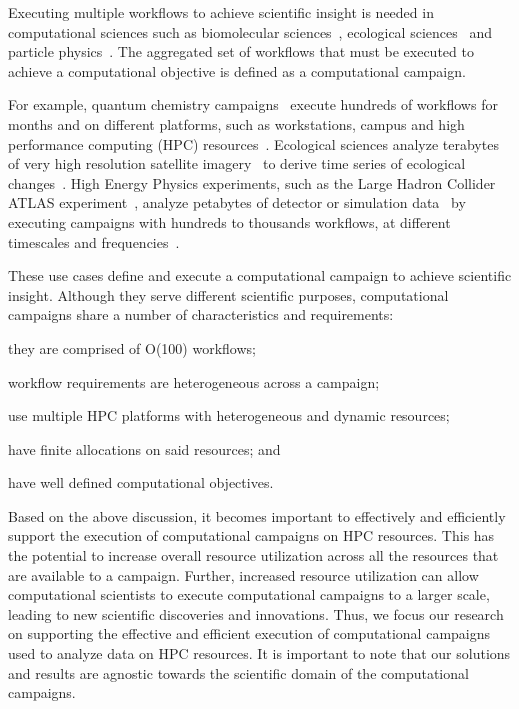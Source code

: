 
Executing multiple workflows to achieve scientific insight is needed in
computational sciences such as biomolecular sciences~\cite{cheatham2015impact,
dakka2018concurrent}, ecological sciences~\cite{goncalves2020sealnet,
paraskevakos2019workflow} and particle physics~\cite{atlas}. The aggregated
set of workflows that must be executed to achieve a computational objective is
defined as a computational campaign.

For example, quantum chemistry campaigns~\cite{smith2020molssi} execute hundreds
of workflows for months and on different platforms, such as workstations, campus
and high performance computing (HPC) resources~\cite{smith2020molssi}.
Ecological sciences analyze terabytes of very high resolution satellite
imagery~\cite{goncalves2020sealnet} to derive time series of ecological
changes~\cite{paraskevakos2019workflow}. High Energy Physics experiments, such
as the Large Hadron Collider ATLAS experiment~\cite{atlas}, analyze petabytes of
detector or simulation data~\cite{borodin2015big} by executing campaigns with
hundreds to thousands workflows, at different timescales and
frequencies~\cite{borodin2015big}.

These use cases define and execute a computational campaign to achieve
scientific insight. Although they serve different scientific purposes,
computational campaigns share a number of characteristics and requirements:
\begin{inparaenum}[(1)]
    \item they are comprised of O(100) workflows;
    \item workflow requirements are heterogeneous across a campaign;
    \item use multiple HPC platforms with heterogeneous and dynamic resources;
    \item have finite allocations on said resources; and
    \item have well defined computational objectives.
\end{inparaenum}

Based on the above discussion, it becomes important to effectively and
efficiently support the execution of computational campaigns on HPC resources.
This has the potential to increase overall resource utilization across all the
resources that are available to a campaign. Further, increased resource
utilization can allow computational scientists to execute computational
campaigns to a larger scale, leading to new scientific discoveries and
innovations. Thus, we focus our research on supporting the effective and
efficient execution of computational campaigns used to analyze data on HPC
resources. It is important to note that our solutions and results are agnostic
towards the scientific domain of the computational campaigns.

